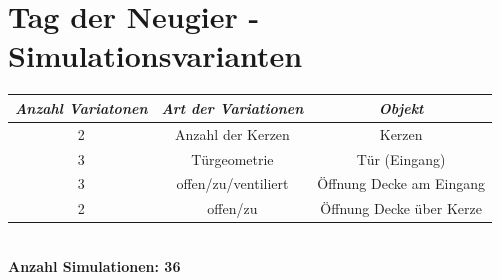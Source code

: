\documentclass[11pt,a4paper]{article}
\begin{document}
\section*{Tag der Neugier - Simulationsvarianten}

\begin{tabular}{ |c|c|c| } 
	 		\hline
			\textit{Anzahl Variatonen} & \textit{Art der Variationen} & \textit{Objekt}\\
			\hline
			2 & Anzahl der Kerzen & Kerzen\\
	 		\hline
	 		3 & Türgeometrie & Tür (Eingang) \\
	 		\hline
	 		3 & offen/zu/ventiliert & Öffnung Decke am Eingang \\
	 		\hline
	 		2 & offen/zu & Öffnung Decke über Kerze \\
	 		\hline
\end{tabular}\\[0.3cm]
\textbf{Anzahl Simulationen: 36}
	
\end{document}

